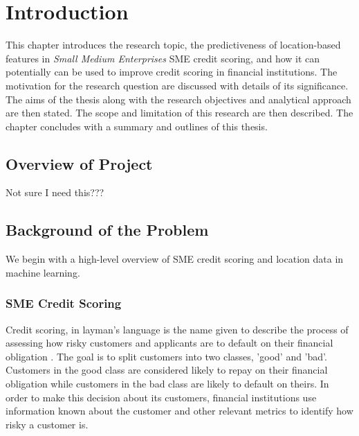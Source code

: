 
\chapter{Introduction} %

\label{Chapter1} %


This chapter introduces the research topic, the predictiveness of location-based features in \textit{Small Medium Enterprises} SME credit scoring, and how it can potentially can be used to improve credit scoring in financial institutions. The motivation for the research question are discussed with details of its significance. The aims of the thesis along with the research objectives and analytical approach are then stated. The scope and limitation of this research are then described. The chapter concludes with a summary and outlines of this thesis.


\section{Overview of Project}
Not sure I need this???


\section{Background of the Problem}

We begin with a high-level overview of SME credit scoring and location data in machine learning.

\subsection{SME Credit Scoring}

Credit scoring, in layman's language is the name given to describe the process of assessing how risky customers and applicants are to default on their financial obligation \citep{hand_statistical_1997}. The goal is to split customers into two classes, 'good' and 'bad'. Customers in the good class are considered likely to repay on their financial obligation while customers in the bad class are likely to default on theirs. In order to make this decision about its customers, financial institutions use information known about the customer and other relevant metrics to identify how risky a customer is. 


